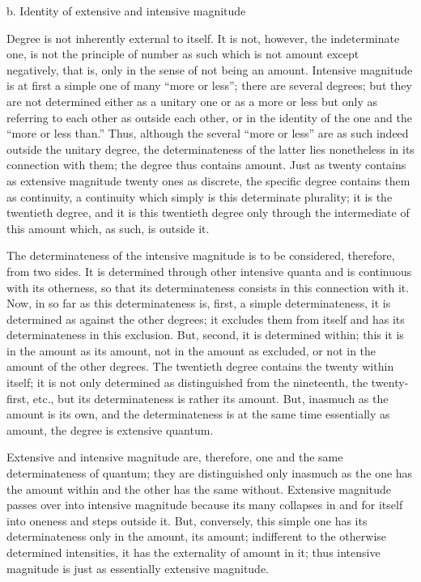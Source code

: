b. Identity of extensive and intensive magnitude

Degree is not inherently external to itself.
It is not, however, the indeterminate one,
is not the principle of number as such
which is not amount except negatively,
that is, only in the sense of not being an amount.
Intensive magnitude is at first a simple one
of many “more or less”;
there are several degrees;
but they are not determined either as a unitary one or as a more or
less but only as referring to each other as outside each other,
or in the identity of the one and the “more or less than.”
Thus, although the several “more
or less” are as such indeed outside the unitary degree,
the determinateness of the latter lies nonetheless
in its connection with them;
the degree thus contains amount.
Just as twenty contains as extensive magnitude
twenty ones as discrete,
the specific degree contains them as continuity,
a continuity which simply is this determinate plurality;
it is the twentieth degree,
and it is this twentieth degree
only through the intermediate of this amount
which, as such, is outside it.

The determinateness of the intensive magnitude is
to be considered, therefore, from two sides.
It is determined through other intensive quanta
and is continuous with its otherness,
so that its determinateness consists
in this connection with it.
Now, in so far as this determinateness is,
first, a simple determinateness,
it is determined as against the other degrees;
it excludes them from itself
and has its determinateness in this exclusion.
But, second, it is determined within;
this it is in the amount as its amount,
not in the amount as excluded,
or not in the amount of the other degrees.
The twentieth degree contains the twenty within itself;
it is not only determined as distinguished from the nineteenth,
the twenty-first, etc.,
but its determinateness is rather its amount.
But, inasmuch as the amount is its own,
and the determinateness is at the same time
essentially as amount, the degree is extensive quantum.

Extensive and intensive magnitude are, therefore,
one and the same determinateness of quantum;
they are distinguished only inasmuch as
the one has the amount within
and the other has the same without.
Extensive magnitude passes over into intensive magnitude
because its many collapses in and for itself
into oneness and steps outside it.
But, conversely, this simple one
has its determinateness only in the amount, its amount;
indifferent to the otherwise determined intensities,
it has the externality of amount in it;
thus intensive magnitude is just as essentially extensive magnitude.

